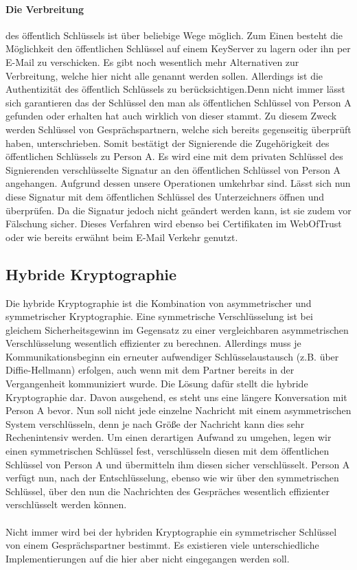 \documentclass[paper=a4,11pt,german]{scrartcl} %
\begin{document}
\paragraph{Die Verbreitung}
des öffentlich Schlüssels ist über beliebige Wege möglich. Zum Einen besteht die Möglichkeit den öffentlichen Schlüssel auf einem KeyServer zu lagern oder ihn per E-Mail zu verschicken. Es gibt noch wesentlich mehr Alternativen zur Verbreitung, welche hier nicht alle genannt werden sollen. Allerdings ist die Authentizität des öffentlich Schlüssels zu berücksichtigen.Denn nicht immer lässt sich garantieren das der Schlüssel den man als öffentlichen Schlüssel von Person A gefunden oder erhalten hat auch wirklich von dieser stammt. Zu diesem Zweck werden Schlüssel von Gesprächspartnern, welche sich bereits gegenseitig überprüft haben, unterschrieben. Somit bestätigt der Signierende die Zugehörigkeit des öffentlichen Schlüssels zu Person A. Es wird eine mit dem privaten Schlüssel des Signierenden verschlüsselte Signatur an den öffentlichen Schlüssel von Person A angehangen. Aufgrund dessen unsere Operationen umkehrbar sind. Lässt sich nun diese Signatur mit dem öffentlichen Schlüssel des Unterzeichners öffnen und überprüfen. Da die Signatur jedoch nicht geändert werden kann, ist sie zudem vor Fälschung sicher. Dieses Verfahren wird ebenso bei Certifikaten im WebOfTrust oder wie bereits erwähnt beim E-Mail Verkehr genutzt.

\subsection{Hybride Kryptographie}
Die hybride Kryptographie ist die Kombination von asymmetrischer und symmetrischer Kryptographie. Eine symmetrische Verschlüsselung ist bei gleichem Sicherheitsgewinn im Gegensatz zu einer vergleichbaren asymmetrischen Verschlüsselung  wesentlich effizienter zu berechnen. Allerdings muss je Kommunikationsbeginn ein erneuter aufwendiger Schlüsselaustausch (z.B. über Diffie-Hellmann) erfolgen, auch wenn mit dem Partner bereits in der Vergangenheit kommuniziert wurde. Die Lösung dafür stellt die hybride Kryptographie dar. Davon ausgehend, es steht uns eine längere Konversation mit Person A bevor. Nun soll nicht jede einzelne Nachricht mit einem asymmetrischen System verschlüsseln, denn je nach Größe der Nachricht kann dies sehr Rechenintensiv werden. Um einen derartigen Aufwand zu umgehen, legen wir einen symmetrischen Schlüssel fest, verschlüsseln diesen mit dem öffentlichen Schlüssel von Person A und übermitteln ihm diesen sicher verschlüsselt. Person A verfügt nun, nach der Entschlüsselung, ebenso wie wir über den symmetrischen Schlüssel, über den nun die Nachrichten des Gespräches wesentlich effizienter verschlüsselt werden können.\\
\ \\
Nicht immer wird bei der hybriden Kryptographie ein symmetrischer Schlüssel von einem Gesprächspartner bestimmt. Es existieren viele unterschiedliche Implementierungen auf die hier aber nicht eingegangen werden soll.
\end{document}
